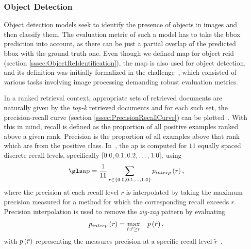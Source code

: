 \subsubsection{Object Detection}

Object detection models seek to identify the presence of objects in images and then classify them. The evaluation metric of such a model has to take the \gls{bbox} prediction into account, as there can be just a partial overlap of the predicted \gls{bbox} with the ground truth one. Even though we defined \gls{map} for object \gls{reid} (section \ref{sssec:ObjectReIdentification}), the \gls{map} is also used for object detection, and its definition was initially formalized in the \pascalvoc{} challenge~\cite{everingham2010pascalvoc}, which consisted of various tasks involving image processing demanding robust evaluation metrics.

In a ranked retrieval context, appropriate sets of retrieved documents are naturally given by the \emph{top-k} retrieved documents and for each such set, the precision-recall curve (section \ref{sssec:PrecisionRecallCurve}) can be plotted~\cite{salton1983introduction}. With this in mind, recall is defined as the proportion of all positive examples ranked above a given rank. Precision is the proportion of all examples above that rank which are from the positive class. In~\cite{everingham2010pascalvoc}, the \gls{ap} is computed for $11$ equally spaced discrete recall levels, specifically $\left[ {0.0, 0.1, 0.2, \dots, 1.0} \right]$, using
\begin{equation}
    \AP = \frac{1}{11} \sum_{r \in \cbrackets{0.0, 0.1, \dots, 1.0}} \func{p_{interp}}{r},
\end{equation}
where the precision at each recall level $r$ is interpolated by taking the maximum precision measured for a method for which the corresponding recall exceeds $r$. Precision interpolation is used to remove the \emph{zig-zag} pattern by evaluating
\begin{equation}
    {p_{interp}} \left( r \right) = \underset{\tilde{r}:\tilde{r} \geq r}{\max} \quad {p} \left( \tilde{r} \right),
\end{equation}
with ${p} \left( \tilde{r} \right)$ representing the measures precision at a specific recall level $\tilde{r}$~\cite{everingham2010pascalvoc, salton1983introduction}.
